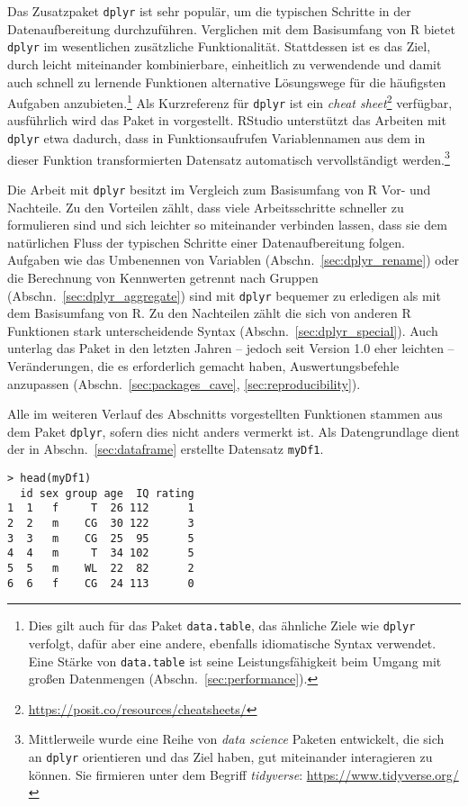 Das Zusatzpaket \lstinline!dplyr! ist sehr populär, um die typischen Schritte in der Datenaufbereitung durchzuführen. Verglichen mit dem Basisumfang von R bietet \lstinline!dplyr! im wesentlichen zusätzliche Funktionalität. Stattdessen ist es das Ziel, durch leicht miteinander kombinierbare, einheitlich zu verwendende und damit auch schnell zu lernende Funktionen alternative Lösungswege für die häufigsten Aufgaben anzubieten.\footnote{Dies gilt auch für das Paket \lstinline!data.table!, das ähnliche Ziele wie \lstinline!dplyr! verfolgt, dafür aber eine andere, ebenfalls idiomatische Syntax verwendet. Eine Stärke von \lstinline!data.table! ist seine Leistungsfähigkeit beim Umgang mit großen Datenmengen (Abschn.\ \ref{sec:performance}).} Als Kurzreferenz für \lstinline!dplyr! ist ein \emph{cheat sheet}\footnote{\url{https://posit.co/resources/cheatsheets/}} verfügbar, ausführlich wird das Paket in  vorgestellt. RStudio unterstützt das Arbeiten mit \lstinline!dplyr! etwa dadurch, dass in Funktionsaufrufen Variablennamen aus dem in dieser Funktion transformierten Datensatz automatisch vervollständigt werden.\footnote{Mittlerweile wurde eine Reihe von \emph{data science} Paketen entwickelt, die sich an \lstinline!dplyr! orientieren und das Ziel haben, gut miteinander interagieren zu können. Sie firmieren unter dem Begriff \emph{tidyverse}: \url{https://www.tidyverse.org/}}

Die Arbeit mit \lstinline!dplyr! besitzt im Vergleich zum Basisumfang von R Vor- und Nachteile. Zu den Vorteilen zählt, dass viele Arbeitsschritte schneller zu formulieren sind und sich leichter so miteinander verbinden lassen, dass sie dem natürlichen Fluss der typischen Schritte einer Datenaufbereitung folgen. Aufgaben wie das Umbenennen von Variablen (Abschn.\ \ref{sec:dplyr_rename}) oder die Berechnung von Kennwerten getrennt nach Gruppen (Abschn.\ \ref{sec:dplyr_aggregate}) sind mit \lstinline!dplyr! bequemer zu erledigen als mit dem Basisumfang von R. Zu den Nachteilen zählt die sich von anderen R Funktionen stark unterscheidende Syntax (Abschn.\ \ref{sec:dplyr_special}). Auch unterlag das Paket in den letzten Jahren -- jedoch seit Version 1.0 eher leichten -- Veränderungen, die es erforderlich gemacht haben, Auswertungsbefehle anzupassen (Abschn.\ \ref{sec:packages_cave}, \ref{sec:reproducibility}).

Alle im weiteren Verlauf des Abschnitts vorgestellten Funktionen stammen aus dem Paket \lstinline!dplyr!, sofern dies nicht anders vermerkt ist. Als Datengrundlage dient der in Abschn.\ \ref{sec:dataframe} erstellte Datensatz \lstinline!myDf1!.
\begin{lstlisting}
> head(myDf1)
  id sex group age  IQ rating
1  1   f     T  26 112      1
2  2   m    CG  30 122      3
3  3   m    CG  25  95      5
4  4   m     T  34 102      5
5  5   m    WL  22  82      2
6  6   f    CG  24 113      0
\end{lstlisting}


